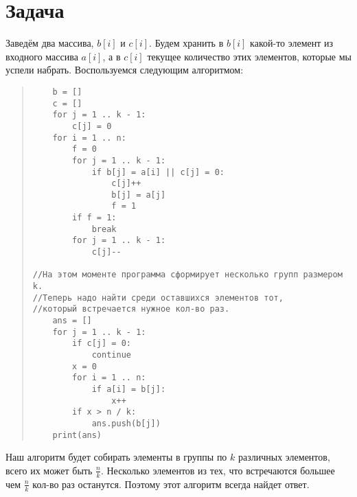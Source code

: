\documentclass{article}
\begin{document}
\section*{Задача }
Заведём два массива, $b[i]$ и $c[i]$. Будем хранить в $b[i]$ какой-то элемент из входного массива $a[i]$, а в $c[i]$ текущее количество этих элементов, которые мы успели набрать. 
\newline
Воспользуемся следующим алгоритмом:
\begin{quote}
\begin{verbatim}
    b = []
    c = []
    for j = 1 .. k - 1:
        c[j] = 0
    for i = 1 .. n:
        f = 0
        for j = 1 .. k - 1:
            if b[j] = a[i] || c[j] = 0:
                c[j]++
                b[j] = a[j]
                f = 1
        if f = 1:
            break   
        for j = 1 .. k - 1:
            c[j]--
                        
//На этом моменте программа сформирует несколько групп размером k. 
//Теперь надо найти среди оставшихся элементов тот, 
//который встречается нужное кол-во раз.
    ans = []
    for j = 1 .. k - 1: 
        if c[j] = 0:
            continue
        x = 0
        for i = 1 .. n:
            if a[i] = b[j]:
                x++
        if x > n / k:
            ans.push(b[j])
    print(ans)    
\end{verbatim}
\end{quote}
Наш алгоритм будет собирать элементы в группы по $k$ различных элементов, всего их может быть $\frac{n}{k}$. Несколько элементов из тех, что встречаются большее чем $\frac{n}{k}$ кол-во раз останутся. Поэтому этот алгоритм всегда найдет ответ.
\end{document}
